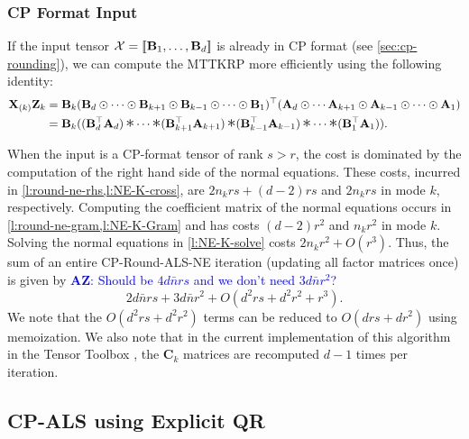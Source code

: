 \documentclass{article}
\newcommand{\mat}[1]{\mathbf{#1}}
\newcommand{\T}[2][]{#1{\mathbf{\cal{#2}}}} 						%
\DeclareMathOperator*{\hada}{\scalebox{1.5}{$\ast$}}
\newcommand{\AZ}[1]{\textcolor{blue}{\textbf{AZ}: #1}}
\begin{document}
\subsubsection{CP Format Input}

If the input tensor {$\T{X}=[\![\mat{B}_{1}, \dots ,\mat{B}_{d}]\!]$} is already in CP format (see \cref{sec:cp-rounding}), we can compute the MTTKRP more efficiently using the following identity:
\begin{align*}
  \mat{X}_{(k)}\mat{Z}_k &= \mat{B}_k(\mat{B}_d \odot \dots \odot \mat{B}_{k+1} \odot \mat{B}_{k-1} \odot \dots \odot \mat{B}_1)^\top(\mat{A}_d \odot \cdots \mat{A}_{k+1} \odot \mat{A}_{k-1} \odot \cdots \odot \mat{A}_1) \\
 &= \mat{B}_k((\mat{B}_d^\top\mat{A}_d) \hada \cdots \hada (\mat{B}_{k+1}^\top\mat{A}_{k+1}) \hada (\mat{B}_{k-1}^\top\mat{A}_{k-1}) \hada \cdots \hada (\mat{B}_1^\top\mat{A}_1)).  
\end{align*}

\begin{algorithm}[!ht]
  \caption{CP-Round-ALS-NE}
  \label{alg:cp-als-ne-k}
   
\end{algorithm}


When the input is a CP-format tensor of rank $s>r$, the cost is dominated by the computation of the right hand side of the normal equations.
These costs, incurred in \cref{l:round-ne-rhs,l:NE-K-cross}, are $2n_krs+(d-2)rs$ and $2n_krs$ in mode $k$, respectively.
Computing the coefficient matrix of the normal equations occurs in \cref{l:round-ne-gram,l:NE-K-Gram} and has costs $(d-2)r^2$ and $n_kr^2$ in mode $k$.
Solving the normal equations in \cref{l:NE-K-solve} costs $2n_kr^2 + O(r^3)$.
Thus, the sum of an entire CP-Round-ALS-NE iteration (updating all factor matrices once) is given by \AZ{Should be $4d\bar n rs$ and we don't need $3d\bar n r^2$?}
\begin{equation*}
{2d\bar{n}rs} + 3d\bar{n}r^2 + O(d^2rs + d^2r^2 + r^3).
\end{equation*}
We note that the $O(d^2rs+d^2r^2)$ terms can be reduced to $O(drs+dr^2)$ using memoization.
We also note that in the current implementation of this algorithm in the Tensor Toolbox \cite{TensorToolbox}, the $\mat{C}_k$ matrices are recomputed $d-1$ times per iteration. 


\subsection{CP-ALS using Explicit QR}
\label{sec:alg:expqr}
\end{document}
